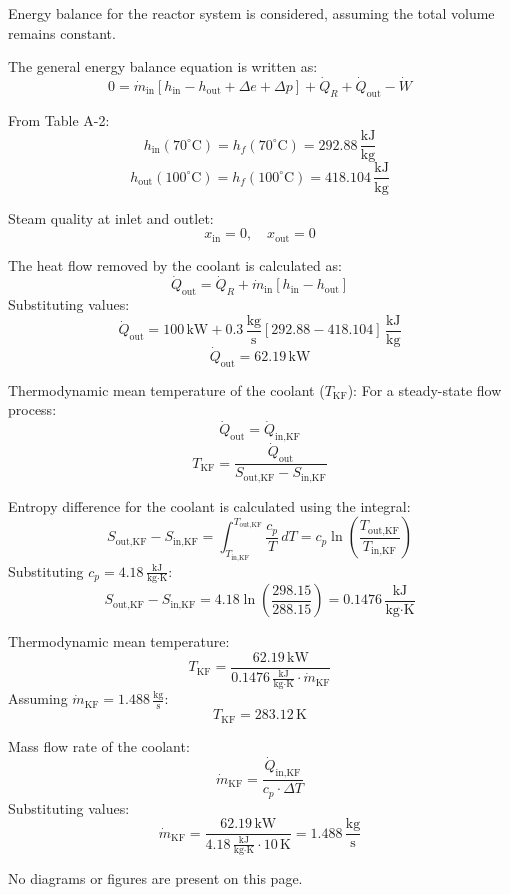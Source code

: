 Energy balance for the reactor system is considered, assuming the total volume remains constant.  

The general energy balance equation is written as:  
\[
0 = \dot{m}_{\text{in}} \left[ h_{\text{in}} - h_{\text{out}} + \Delta e + \Delta p \right] + \dot{Q}_R + \dot{Q}_{\text{out}} - \dot{W}
\]  

From Table A-2:  
\[
h_{\text{in}}(70^\circ\text{C}) = h_f(70^\circ\text{C}) = 292.88 \, \frac{\text{kJ}}{\text{kg}}
\]  
\[
h_{\text{out}}(100^\circ\text{C}) = h_f(100^\circ\text{C}) = 418.104 \, \frac{\text{kJ}}{\text{kg}}
\]  

Steam quality at inlet and outlet:  
\[
x_{\text{in}} = 0, \quad x_{\text{out}} = 0
\]  

The heat flow removed by the coolant is calculated as:  
\[
\dot{Q}_{\text{out}} = \dot{Q}_R + \dot{m}_{\text{in}} \left[ h_{\text{in}} - h_{\text{out}} \right]
\]  
Substituting values:  
\[
\dot{Q}_{\text{out}} = 100 \, \text{kW} + 0.3 \, \frac{\text{kg}}{\text{s}} \left[ 292.88 - 418.104 \right] \, \frac{\text{kJ}}{\text{kg}}
\]  
\[
\dot{Q}_{\text{out}} = 62.19 \, \text{kW}
\]  

Thermodynamic mean temperature of the coolant (\( T_{\text{KF}} \)):  
For a steady-state flow process:  
\[
\dot{Q}_{\text{out}} = \dot{Q}_{\text{in,KF}}
\]  
\[
T_{\text{KF}} = \frac{\dot{Q}_{\text{out}}}{S_{\text{out,KF}} - S_{\text{in,KF}}}
\]  

Entropy difference for the coolant is calculated using the integral:  
\[
S_{\text{out,KF}} - S_{\text{in,KF}} = \int_{T_{\text{in,KF}}}^{T_{\text{out,KF}}} \frac{c_p}{T} \, dT = c_p \ln \left( \frac{T_{\text{out,KF}}}{T_{\text{in,KF}}} \right)
\]  
Substituting \( c_p = 4.18 \, \frac{\text{kJ}}{\text{kg·K}} \):  
\[
S_{\text{out,KF}} - S_{\text{in,KF}} = 4.18 \ln \left( \frac{298.15}{288.15} \right) = 0.1476 \, \frac{\text{kJ}}{\text{kg·K}}
\]  

Thermodynamic mean temperature:  
\[
T_{\text{KF}} = \frac{62.19 \, \text{kW}}{0.1476 \, \frac{\text{kJ}}{\text{kg·K}} \cdot \dot{m}_{\text{KF}}}
\]  
Assuming \( \dot{m}_{\text{KF}} = 1.488 \, \frac{\text{kg}}{\text{s}} \):  
\[
T_{\text{KF}} = 283.12 \, \text{K}
\]  

Mass flow rate of the coolant:  
\[
\dot{m}_{\text{KF}} = \frac{\dot{Q}_{\text{in,KF}}}{c_p \cdot \Delta T}
\]  
Substituting values:  
\[
\dot{m}_{\text{KF}} = \frac{62.19 \, \text{kW}}{4.18 \, \frac{\text{kJ}}{\text{kg·K}} \cdot 10 \, \text{K}} = 1.488 \, \frac{\text{kg}}{\text{s}}
\]  

No diagrams or figures are present on this page.